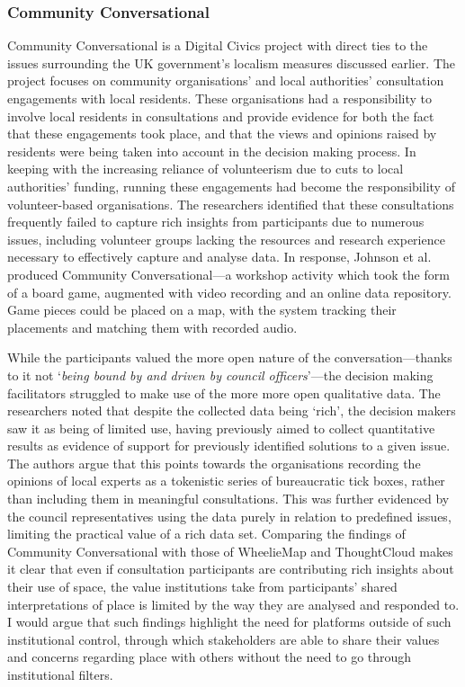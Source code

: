 \subsubsection{Community Conversational}

Community Conversational \citep{Johnson2017} is a Digital Civics project with direct ties to the issues surrounding the UK government's localism measures discussed earlier. The project focuses on community organisations' and local authorities' consultation engagements with local residents. These organisations had a responsibility to involve local residents in consultations and provide evidence for both the fact that these engagements took place, and that the views and opinions raised by residents were being taken into account in the decision making process. In keeping with the increasing reliance of volunteerism due to cuts to local authorities' funding, running these engagements had become the responsibility of volunteer-based organisations. The researchers identified that these consultations frequently failed to capture rich insights from participants due to numerous issues, including volunteer groups lacking the resources and research experience necessary to effectively capture and analyse data. In response, Johnson et al. produced Community Conversational---a workshop activity which took the form of a board game, augmented with video recording and an online data repository. Game pieces could be placed on a map, with the system tracking their placements and matching them with recorded audio.

While the participants valued the more open nature of the conversation---thanks to it not `\textit{being bound by and driven by council officers}'---the decision making facilitators struggled to make use of the more more open qualitative data. The researchers noted that despite the collected data being `rich', the decision makers saw it as being of limited use, having previously aimed to collect quantitative results as evidence of support for previously identified solutions to a given issue. The authors argue that this points towards the organisations recording the opinions of local experts as a tokenistic series of bureaucratic tick boxes, rather than including them in meaningful consultations. This was further evidenced by the council representatives using the data purely in relation to predefined issues, limiting the practical value of a rich data set. Comparing the findings of Community Conversational with those of WheelieMap and ThoughtCloud makes it clear that even if consultation participants are contributing rich insights about their use of space, the value institutions take from participants' shared interpretations of place is limited by the way they are analysed and responded to. I would argue that such findings highlight the need for platforms outside of such institutional control, through which stakeholders are able to share their values and concerns regarding place with others without the need to go through institutional filters.

